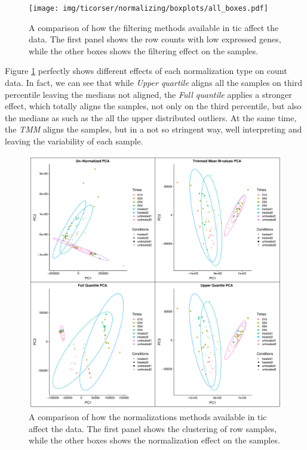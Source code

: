 \begin{figure}[H]
\texttt{[image: img/ticorser/normalizing/boxplots/all\_boxes.pdf]}
\caption[ticorser normalizing methods]{A comparison of how the filtering methods available in \gls{tic} affect the data.
The first panel shows the row counts with low expressed genes, while the other boxes shows the filtering effect on the samples.}
\label{fig:ticorsernormalizingbox}
\centering
\end{figure}

Figure \ref{fig:ticorsernormalizingbox} perfectly shows different effects of each normalization type on count data.  
In fact, we can see that while \textit{Upper quartile} aligns all the samples on third percentile leaving the medians not aligned, the \textit{Full quantile} applies a stronger effect, which totally aligns the samples, not only on the third percentile, but also the medians as such as the all the upper distributed outliers.
At the same time, the \textit{TMM} aligns the samples, but in a not so stringent way, well interpreting and leaving the variability of each sample.

\begin{figure}[H]
\includegraphics[width=12cm,keepaspectratio]{img/ticorser/normalizing/pca/all_pca.pdf}
\caption[ticorser normalizing methods]{A comparison of how the normalizations methods available in \gls{tic} affect the data.
The first panel shows the clustering of row samples, while the other boxes shows the normalization effect on the samples.}
\label{fig:ticorsernormalizingpca}
\centering
\end{figure}

